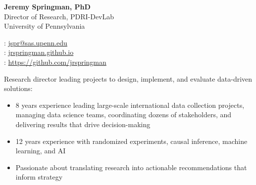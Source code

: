 \documentclass[11pt]{article}
\renewcommand{\today}{\monthname[\the\month] \the\year}
\begin{document}
\thispagestyle{empty}



\begin{multicols}{2}
{\Large {\bf Jeremy Springman, PhD}}\\
Director of Research, PDRI-DevLab\\
University of Pennsylvania\\

\columnbreak
\begin{flushright}

\faEnvelope: \href{mailto:jspr@sas.upenn.edu}{jspr@sas.upenn.edu}\\
\faLaptop: \url{jrspringman.github.io}\\
\faGithub: \url{https://github.com/jrspringman}\\
\end{flushright}
\end{multicols}
\vspace{-10pt}

Research director leading projects to design, implement, and evaluate data-driven solutions:
\begin{itemize}[itemsep=0mm, parsep=0pt]
\item 8 years experience leading large-scale international data collection projects, managing data science teams, coordinating dozens of stakeholders, and delivering results that drive decision-making
\item 12 years experience with randomized experiments, causal inference, machine learning, and AI 
\item Passionate about translating research into actionable recommendations that inform strategy
\end{itemize}
\end{document}
